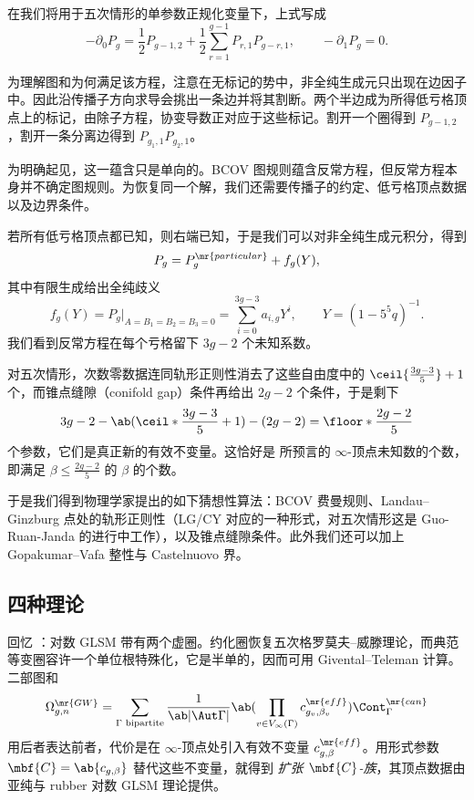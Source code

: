 \begin{rmk}
    在我们将用于五次情形的单参数正规化变量下，上式写成
    \[ -\partial_0 P_g = \frac{1}{2}P_{g-1,2} + \frac{1}{2}\sum_{r=1}^{g-1}P_{r,1}P_{g-r,1}, \qquad -\partial_1 P_g = 0. \]
\end{rmk}

为理解图和为何满足该方程，注意在无标记的势中，非全纯生成元只出现在边因子中。因此沿传播子方向求导会挑出一条边并将其割断。两个半边成为所得低亏格顶点上的标记，由除子方程，协变导数正对应于这些标记。割开一个圈得到 \(P_{g-1,2}\)，割开一条分离边得到 \(P_{g_1,1}P_{g_2,1}\)。

\begin{rmk}
    为明确起见，这一蕴含只是单向的。BCOV 图规则蕴含反常方程，但反常方程本身并不确定图规则。为恢复同一个解，我们还需要传播子的约定、低亏格顶点数据以及边界条件。
\end{rmk}

若所有低亏格顶点都已知，则右端已知，于是我们可以对非全纯生成元积分，得到
\[ P_g = P_g^{\mr{particular}} + f_g(Y), \]
其中有限生成给出全纯歧义
\[ f_g(Y) = P_g|_{A = B_1 = B_2 = B_3 = 0} = \sum_{i=0}^{3g-3}a_{i,g}Y^i, \qquad Y = (1-5^5q)^{-1}. \]
我们看到反常方程在每个亏格留下 \(3g-2\) 个未知系数。

\begin{rmk}
    对五次情形，次数零数据连同轨形正则性消去了这些自由度中的 \(\ceil{\frac{3g-3}{5}}+1\) 个，而锥点缝隙（conifold gap）条件再给出 \(2g-2\) 个条件，于是剩下
    \[ 3g-2 - \ab(\ceil*{\frac{3g-3}{5}}+1) - (2g-2) = \floor*{\frac{2g-2}{5}} \]
    个参数，它们是真正新的有效不变量。这恰好是  所预言的 \(\infty\)-顶点未知数的个数，即满足 \(\beta \leq \frac{2g-2}{5}\) 的 \(\beta\) 的个数。
\end{rmk}

于是我们得到物理学家提出的如下猜想性算法：BCOV 费曼规则、Landau–Ginzburg 点处的轨形正则性（LG/CY 对应的一种形式，对五次情形这是 Guo-Ruan-Janda 的进行中工作），以及锥点缝隙条件。此外我们还可以加上 Gopakumar–Vafa 整性与 Castelnuovo 界。

\subsection{四种理论}%
\label{sub:Four theories}

回忆 ：对数 GLSM 带有两个虚圈。约化圈恢复五次格罗莫夫–威滕理论，而典范等变圈容许一个单位根特殊化，它是半单的，因而可用 Givental–Teleman 计算。二部图和
\[ \Omega^{\mr{GW}}_{g,n} = \sum_{\Gamma \text{ bipartite}} \frac{1}{\ab|\Aut \Gamma|} \ab( \prod_{v \in V_{\infty}(\Gamma)} c^{\mr{eff}}_{g_v,\beta_v}) \Cont^{\mr{can}}_{\Gamma} \]
用后者表达前者，代价是在 \(\infty\)-顶点处引入有效不变量 \(c^{\mr{eff}}_{g,\beta}\)。用形式参数 \(\mbf{C} = \ab\{c_{g,\beta}\}\) 替代这些不变量，就得到 \textit{扩张 \(\mbf{C}\)-族}，其顶点数据由亚纯与 rubber 对数 GLSM 理论提供。

